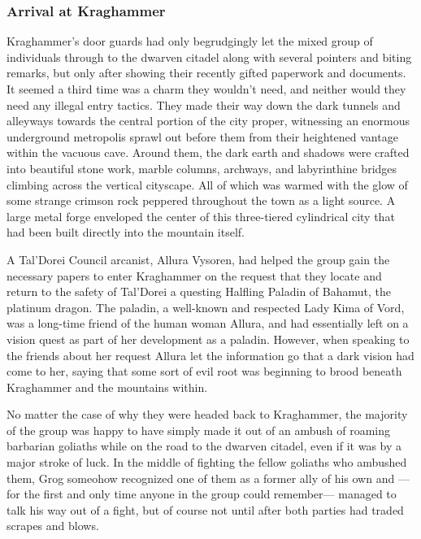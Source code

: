 \setlength{\parindent}{4em}
\setlength{\parskip}{0.5em}
\renewcommand{\baselinestretch}{1.0}

\subsubsection{Arrival at Kraghammer}

\hfill %

\huge \textsc{K}\normalsize raghammer's door guards had only begrudgingly let the mixed group of individuals through to the dwarven citadel along with several pointers and biting remarks, but only after showing their recently gifted paperwork and documents. It seemed a third time was a charm they wouldn't need, and neither would they need any illegal entry tactics. They made their way down the dark tunnels and alleyways towards the central portion of the city proper, witnessing an enormous underground metropolis sprawl out before them from their heightened vantage within the vacuous cave. Around them, the dark earth and shadows were crafted into beautiful stone work, marble columns, archways, and labyrinthine bridges climbing across the vertical cityscape. All of which was warmed with the glow of some strange crimson rock peppered throughout the town as a light source. A large metal forge enveloped the center of this three-tiered cylindrical city that had been built directly into the mountain itself.

A Tal'Dorei Council arcanist, Allura Vysoren, had helped the group gain the necessary papers to enter Kraghammer on the request that they locate and return to the safety of Tal'Dorei a questing Halfling Paladin of Bahamut, the platinum dragon. The paladin, a well-known and respected Lady Kima of Vord, was a long-time friend of the human woman Allura, and had essentially left on a vision quest as part of her development as a paladin. However, when speaking to the friends about her request Allura let the information go that a dark vision had come to her, saying that some sort of evil root was beginning to brood beneath Kraghammer and the mountains within. 

No matter the case of why they were headed back to Kraghammer, the majority of the group was happy to have simply made it out of an ambush of roaming barbarian goliaths while on the road to the dwarven citadel, even if it was by a major stroke of luck. In the middle of fighting the fellow goliaths who ambushed them, Grog someohow recognized one of them as a former ally of his own and ---for the first and only time anyone in the group could remember--- managed to talk his way out of a fight, but of course not until after both parties had traded scrapes and blows.


